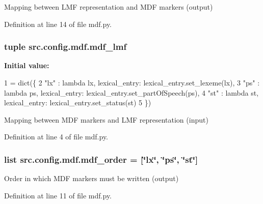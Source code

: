 Mapping between L\+M\+F representation and M\+D\+F markers (output) 



Definition at line 14 of file mdf.\+py.

\hypertarget{namespacesrc_1_1config_1_1mdf_af881a7b706c096ffc4facc7ffafa7687}{
\subsubsection[{mdf\+\_\+lmf}]{\setlength{\rightskip}{0pt plus 5cm}tuple src.\+config.\+mdf.\+mdf\+\_\+lmf}}\label{namespacesrc_1_1config_1_1mdf_af881a7b706c096ffc4facc7ffafa7687}
{\bfseries Initial value\+:}
\begin{DoxyCode}
1 = dict(\{
2     \textcolor{stringliteral}{"lx"} : \textcolor{keyword}{lambda} lx, lexical\_entry: lexical\_entry.set\_lexeme(lx),
3     \textcolor{stringliteral}{"ps"} : \textcolor{keyword}{lambda} ps, lexical\_entry: lexical\_entry.set\_partOfSpeech(ps),
4     \textcolor{stringliteral}{"st"} : \textcolor{keyword}{lambda} st, lexical\_entry: lexical\_entry.set\_status(st)
5 \})
\end{DoxyCode}


Mapping between M\+D\+F markers and L\+M\+F representation (input) 



Definition at line 4 of file mdf.\+py.

\hypertarget{namespacesrc_1_1config_1_1mdf_a0761366bb6d76340e4bea370efce7a7a}{
\subsubsection[{mdf\+\_\+order}]{\setlength{\rightskip}{0pt plus 5cm}list src.\+config.\+mdf.\+mdf\+\_\+order = \mbox{[}\char`\"{}lx\char`\"{}, \char`\"{}ps\char`\"{}, \char`\"{}st\char`\"{}\mbox{]}}}\label{namespacesrc_1_1config_1_1mdf_a0761366bb6d76340e4bea370efce7a7a}


Order in which M\+D\+F markers must be written (output) 



Definition at line 11 of file mdf.\+py.

